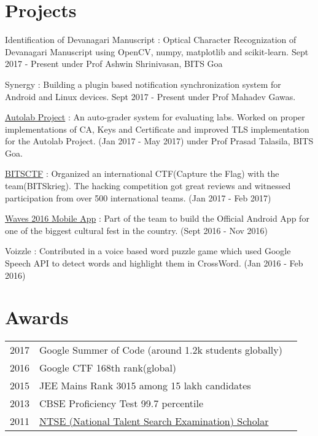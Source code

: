 \documentclass[]{deedy-resume-openfont}
\begin{document}
\begin{minipage}[t]{0.66\textwidth}
\section{Projects}
\vspace{1mm}
\begin{tightemize}

\item Identification of Devanagari Manuscript : Optical Character Recognization of Devanagari Manuscript using OpenCV, numpy, matplotlib and scikit-learn. Sept 2017 - Present under Prof Ashwin Shrinivasan, BITS Goa

\item Synergy : Building a plugin based notification synchronization system for Android
and Linux devices. Sept 2017 - Present under Prof Mahadev Gawas.

\item \href{https://github.com/AutolabJS/AutolabJS}{Autolab Project} : An auto-grader system for evaluating labs. Worked on proper implementations of CA, Keys and Certificate and improved TLS implementation for the Autolab Project. (Jan 2017 - May 2017) under Prof Prasad Talasila, BITS Goa.

\item \href{https://ctftime.org/event/417}{BITSCTF} : Organized an international CTF(Capture the Flag) with the team(BITSkrieg). The hacking competition got great reviews and witnessed participation from over 500 international teams. (Jan 2017 - Feb 2017)

\item \href{https://play.google.com/store/apps/details?id=bits.mobileappclub.waves2016&hl=en}{Waves 2016 Mobile App} : Part of the team to build the Official Android App for one of the biggest cultural fest in the country. (Sept 2016 - Nov 2016)

\item Voizzle : Contributed in a voice based word puzzle game which used Google Speech API to detect words and highlight them in CrossWord. (Jan 2016 - Feb 2016)
\end{tightemize}
\sectionsep


\section{Awards} 
\begin{tabular}{rll}
2017 		 & Google Summer of Code (around 1.2k students globally) \\
2016 		 & Google CTF 168th rank(global)\\
2015 		 & JEE Mains Rank 3015 among 15 lakh candidates\\
2013  		 & CBSE Proficiency Test 99.7 percentile\\
2011	     & \href{https://en.wikipedia.org/wiki/National_Talent_Search_Examination}{NTSE (National Talent Search Examination) Scholar}\\
\end{tabular}
\sectionsep


\end{minipage}
\end{document}
